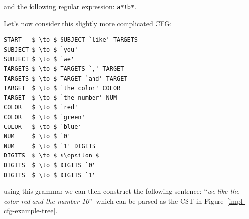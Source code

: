 \documentclass[]{usiinfbachelorproject}
\begin{document}
\begin{center}
\end{center}

\noindent and the following regular expression: \texttt{a*!b*}.

Let's now consider this slightly more complicated CFG\@:

\begin{lstlisting}[caption={Example of a CFG},
                   label=impl-cfg-example]
START   $ \to $ SUBJECT `like' TARGETS
SUBJECT $ \to $ `you'
SUBJECT $ \to $ `we'
TARGETS $ \to $ TARGETS `,' TARGET
TARGETS $ \to $ TARGET `and' TARGET
TARGET  $ \to $ `the color' COLOR
TARGET  $ \to $ `the number' NUM
COLOR   $ \to $ `red'
COLOR   $ \to $ `green'
COLOR   $ \to $ `blue'
NUM     $ \to $ `0'
NUM     $ \to $ `1' DIGITS
DIGITS  $ \to $ $\epsilon $
DIGITS  $ \to $ DIGITS `0'
DIGITS  $ \to $ DIGITS `1'
\end{lstlisting}

using this grammar we can then construct the following sentence:
``\textit{we like the color red and the number 10}'', which
can be parsed as the CST in Figure~\ref{impl-cfg-example-tree}.
\end{document}

